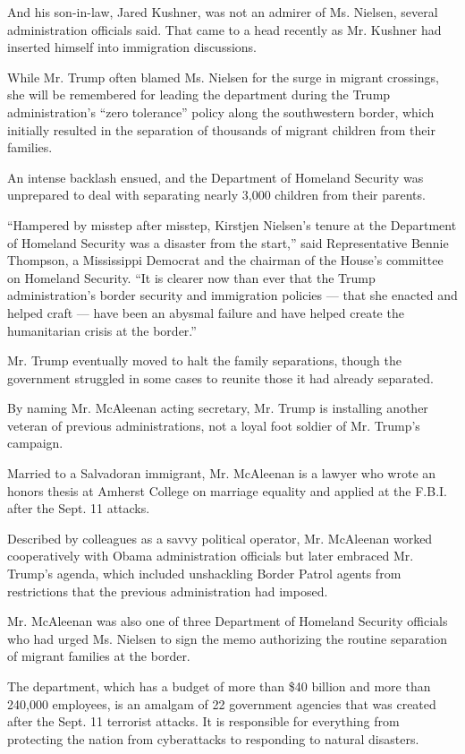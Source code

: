 And his son-in-law, Jared Kushner, was not an admirer of Ms. Nielsen,
several administration officials said. That came to a head recently as
Mr. Kushner had inserted himself into immigration discussions.

While Mr. Trump often blamed Ms. Nielsen for the surge in migrant
crossings, she will be remembered for leading the department during the
Trump administration's ``zero tolerance'' policy along the southwestern
border, which initially resulted in the separation of thousands of
migrant children from their families.

An intense backlash ensued, and the Department of Homeland Security was
unprepared to deal with separating nearly 3,000 children from their
parents.

``Hampered by misstep after misstep, Kirstjen Nielsen's tenure at the
Department of Homeland Security was a disaster from the start,'' said
Representative Bennie Thompson, a Mississippi Democrat and the chairman
of the House's committee on Homeland Security. ``It is clearer now than
ever that the Trump administration's border security and immigration
policies --- that she enacted and helped craft --- have been an abysmal
failure and have helped create the humanitarian crisis at the border.''

Mr. Trump eventually moved to halt the family separations, though the
government struggled in some cases to reunite those it had already
separated.

By naming Mr. McAleenan acting secretary, Mr. Trump is installing
another veteran of previous administrations, not a loyal foot soldier of
Mr. Trump's campaign.

Married to a Salvadoran immigrant, Mr. McAleenan is a lawyer who wrote
an honors thesis at Amherst College on marriage equality and applied at
the F.B.I. after the Sept. 11 attacks.

Described by colleagues as a savvy political operator, Mr. McAleenan
worked cooperatively with Obama administration officials but later
embraced Mr. Trump's agenda, which included unshackling Border Patrol
agents from restrictions that the previous administration had imposed.

Mr. McAleenan was also one of three Department of Homeland Security
officials who had urged Ms. Nielsen to sign the memo authorizing the
routine separation of migrant families at the border.

The department, which has a budget of more than \$40 billion and more
than 240,000 employees, is an amalgam of 22 government agencies that was
created after the Sept. 11 terrorist attacks. It is responsible for
everything from protecting the nation from cyberattacks to responding to
natural disasters.

